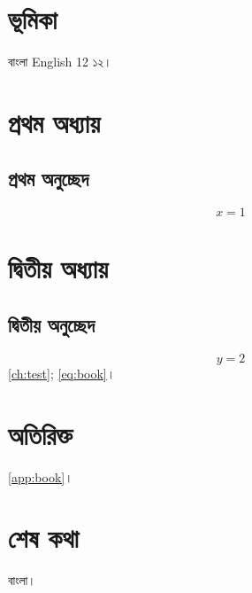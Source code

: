 \frontmatter\tableofcontents\chapter{ভূমিকা}বাংলা English 12 ১২।
\mainmatter\chapter{প্রথম অধ্যায়}\label{ch:test}
\section{প্রথম অনুচ্ছেদ}
\begin{equation}x=1\label{eq:book}\end{equation}
\chapter{দ্বিতীয় অধ্যায়}\section{দ্বিতীয় অনুচ্ছেদ}
\begin{equation}y=2\end{equation}
\autoref{ch:test}; \eqref{eq:book}।
\appendix\chapter{অতিরিক্ত}\label{app:book}
\autoref{app:book}।
\backmatter\chapter{শেষ কথা}বাংলা।
